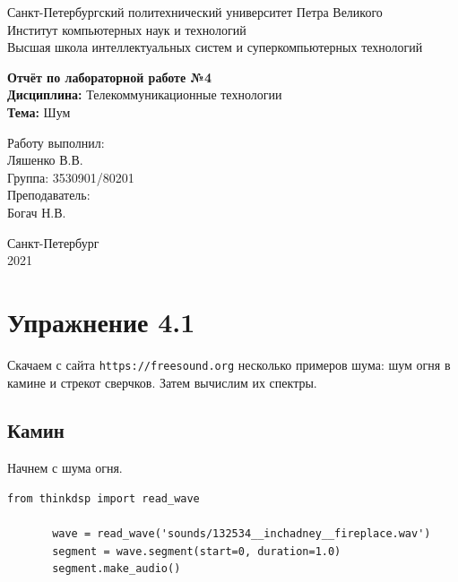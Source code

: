 \documentclass[a4paper,12pt]{report}
\begin{document}
 

\begin{titlepage}
\newpage
	\begin{center}
		\large Санкт-Петербургский политехнический университет Петра Великого\\
		Институт компьютерных наук и технологий\\
		Высшая школа интеллектуальных систем и суперкомпьютерных технологий\\
	\end{center}
\vspace{7cm}

\begin{center}
		\large \textbf{Отчёт по лабораторной работе №4} \\
		\textbf{Дисциплина:} Телекоммуникационные технологии\\
		\textbf{Тема:} Шум
\end{center}
\vspace{4cm}
	
\begin{flushright}
		\large Работу выполнил:\\ Ляшенко В.В.\\
		Группа: 3530901/80201\\
		Преподаватель:\\ Богач Н.В.
\end{flushright}

\vspace{\fill}
\begin{center}
	\large Санкт-Петербург\\ 2021
	\end{center}
\end{titlepage}

\tableofcontents
\listoffigures
\lstlistoflistings

\chapter{Упражнение 4.1}
    Скачаем с сайта \texttt{https://freesound.org} несколько примеров шума: шум огня в камине и стрекот сверчков. Затем вычислим их спектры.
    
\section{Камин}
    Начнем с шума огня.
\begin{lstlisting}[caption=Выделение сегмента]
       from thinkdsp import read_wave

       wave = read_wave('sounds/132534__inchadney__fireplace.wav')
       segment = wave.segment(start=0, duration=1.0)
       segment.make_audio()
\end{lstlisting}
    
\end{document}

